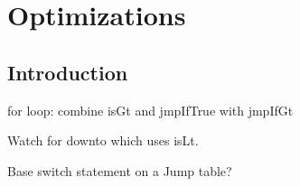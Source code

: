 {\bfseries\slshape\sffamily\color{ChapterTitleColor} \chapter{Optimizations}} \label{chap:opimization}

\section{Introduction}

for loop: combine isGt and jmpIfTrue with jmpIfGt

Watch for downto which uses isLt.

Base switch statement on a Jump table? 